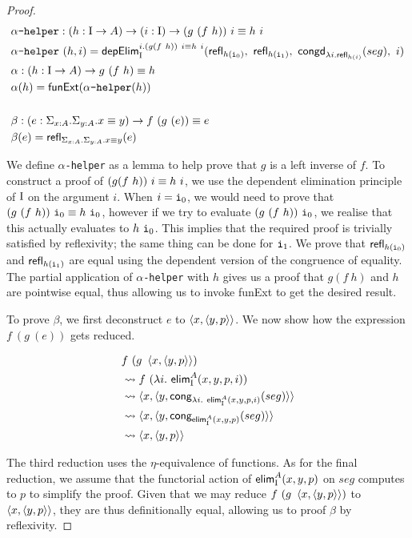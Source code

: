 \documentclass[12pt,twoside,maitrise]{dms}
\theoremstyle{definition}
\numberwithin{equation}{section}
\numberwithin{table}{chapter}
\numberwithin{figure}{chapter}
\newcommand\kw[1] {\textsf{#1}}
\newcommand\id[1] {\texttt{#1}}
\begin{document}
\begin{proof}
\begin{align*}
  & \id{$\alpha$-helper} : (\oftype{h}{\bI \rightarrow A}) \rightarrow (\oftype{i}{\bI}) \rightarrow \eqtype{(g \ (f \ h)) \ i}{h \ i} \\
  & \id{$\alpha$-helper} \ (h , i) = \kw{depElim}_{\bI}^{i.\eqtype{(g (f \ h)) \ i}{h \ i}}(\kw{refl}_{h (\ileft)}, \ \kw{refl}_{h (\iright)}, \ \kw{congd}_{\lambda i . \kw{refl}_{h(i)}}(seg), \ i) \\
  & \alpha : (\oftype{h}{\bI \rightarrow A}) \rightarrow \eqtype{g \ (f \ h)}{h} \\
  & \alpha(h) =  \kw{funExt} (\id{$\alpha$-helper} (h)) \\ \\
  & \beta :  (\oftype{e}{\Sigma_{\oftype{x}{A}} . \Sigma_{\oftype{y}{A}} . \eqtype{x}{y}}) \rightarrow f \ (g \ (e)) \equiv e \\
  & \beta(e) =  \refl{\Sigma_{\oftype{x}{A}} . \Sigma_{\oftype{y}{A}} . \eqtype{x}{y}}{e}
\end{align*}

We define \id{$\alpha$-helper} as a lemma to help prove that $g$ is a left
inverse of $f$. To construct a proof of $\eqtype{(g (f \ h)) \ i}{h \ i}$, we
use the dependent elimination principle of $\mathrm{I}$ on the argument $i$. When $i =
\ileft$, we would need to prove that $\eqtype{(g \ (f \ h)) \ \ileft}{h
  \ \ileft}$, however if we try to evaluate $(g \ (f \ h)) \ \ileft$, we realise
that this actually evaluates to $h \ \ileft$. This implies that the required
proof is trivially satisfied by reflexivity; the same thing can be done for
$\iright$. We prove that $\kw{refl}_{h (\ileft)}$ and $\kw{refl}_{h (\iright)}$
are equal using the dependent version of the congruence of equality. The partial
application of \id{$\alpha$-helper} with $h$ gives us a proof that $g(f \ h)$
and $h$ are pointwise equal, thus allowing us to invoke \kw{funExt} to get the
desired result.

To prove $\beta$, we first deconstruct $e$ to $\braket{x, \braket{y, p}}$. We
now show how the expression $f \ (g \ (e))$ gets reduced.

\begin{align*}
  & f \ (g \ \braket{x, \braket{y, p}})  \\
  & \rightsquigarrow f \ (\lambda i . \ \kw{elim}_{\bI}^{A}(x, y, p, i)) \\
  & \rightsquigarrow \braket{x, \braket{y, \kw{cong}_{\lambda i . \ \kw{elim}_{\bI}^{A}(x, y, p, i)}(seg)}} \\
  & \rightsquigarrow \braket{x, \braket{y, \kw{cong}_{\kw{elim}_{\bI}^{A}(x, y, p)}(seg)}} \\
  & \rightsquigarrow \braket{x, \braket{y, p}} \\
\end{align*}

The third reduction uses the $\eta$-equivalence of functions. As for the final
reduction, we assume that the functorial action of $\kw{elim}_{\bI}^{A}(x, y, p)$
on $seg$ computes to $p$ to simplify the proof. Given that we may reduce $f \ (g
\ \braket{x, \braket{y, p}})$ to $\braket{x, \braket{y, p}}$, they are thus
definitionally equal, allowing us to proof $\beta$ by reflexivity.\end{proof}
\end{document}
